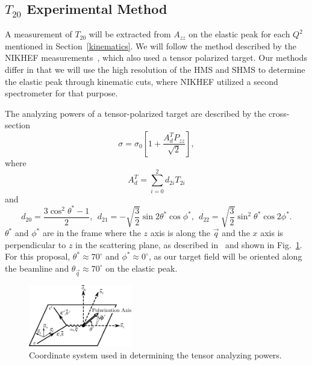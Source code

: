 \subsection{$T_{20}$ Experimental Method} %
\label{t20_exp}

A measurement of $T_{20}$ will be extracted from $A_{zz}$ on the elastic peak for each $Q^2$ mentioned in Section~\ref{kinematics}. We will follow the method described by the NIKHEF measurements~\cite{Bouwhuis:1998re}, which also used a tensor polarized target. Our methods differ in that we will use the high resolution of the HMS and SHMS to determine the elastic peak through kinematic cuts, where NIKHEF utilized a second spectrometer for that purpose. 

The analyzing powers of a tensor-polarized target are described by the cross-section
\begin{equation}
\sigma = \sigma_0\left[ 1 + \frac{A_d^T P_{zz}}{\sqrt{2}} \right],
\label{cs-ana}
\end{equation}
where
\begin{equation} A^T_d = \sum_{i=0}^{2}d_{2i}T_{2i}
\end{equation}
and
\begin{equation} d_{20} = \frac{3 \cos^2 \theta^* -1}{2},~~d_{21} = -\sqrt{\frac{3}{2}}\sin2\theta^*\cos\phi^*,~~d_{22}=\sqrt{\frac{3}{2}}\sin^2\theta^*\cos 2\phi^*.
\end{equation}
$\theta^*$ and $\phi^*$ are in the frame where the $z$ axis is along the $\vec{q}$ and the $x$ axis is perpendicular to $z$ in the scattering plane, as described in~\cite{Donnelly:1985ry} and shown in Fig.~\ref{coords}. For this proposal, $\theta^* \approx 70^{\circ}$ and $\phi^* \approx 0^{\circ}$, as our target field will be oriented along the beamline and $\theta_{\vec{q}}\approx 70^{\circ}$ on the elastic peak.

\begin{figure}
\begin{center}
\includegraphics[width=0.4\textwidth]{figs/coordinate_system.eps} 
\caption{\label{coords}Coordinate system used in determining the tensor analyzing powers.
}
\end{center}
\end{figure}

